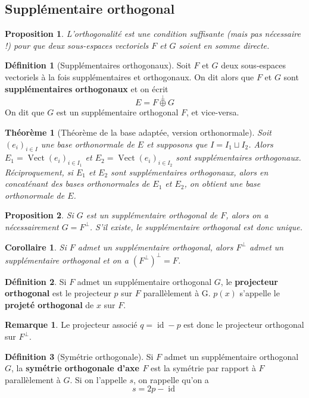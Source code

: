 \documentclass[french]{book}
\theoremstyle{plain}
\newtheorem{thm}{Théorème}[chapter]
\newtheorem{prop}{Proposition}[chapter]
\newtheorem{cor}{Corollaire}[chapter]
\theoremstyle{definition}
\newtheorem{dfn}{Définition}[chapter]
\newtheorem{rmq}{Remarque}[chapter]
\theoremstyle{remark}
\DeclareMathOperator{\vect}{Vect}
\DeclareMathOperator{\id}{id}
\begin{document}
\subsection{Supplémentaire orthogonal}
\begin{prop}
	L'orthogonalité est une condition suffisante (mais pas nécessaire !) pour que deux sous-espaces vectoriels $F$ et $G$ soient en somme directe.
\end{prop}
\begin{dfn}[Supplémentaires orthogonaux]
	Soit $F$ et $G$ deux sous-espaces vectoriels à la fois supplémentaires et orthogonaux. On dit alors que $F$ et $G$ sont \textbf{supplémentaires orthogonaux} et on écrit $$E=F\overset{\perp}{\oplus} G$$ On dit que $G$ est un supplémentaire orthogonal $F$, et vice-versa.
\end{dfn}
\begin{thm}[Théorème de la base adaptée, version orthonormale]
	Soit $(e_i)_{i\in I}$ une base orthonormale de $E$ et supposons que $I=I_1\sqcup I_2$. Alors $E_1=\vect(e_i)_{i\in I_1}$ et $E_2=\vect(e_i)_{i\in I_2}$ sont supplémentaires orthogonaux. Réciproquement, si $E_1$ et $E_2$ sont supplémentaires orthogonaux, alors en concaténant des bases orthonormales de $E_1$ et $E_2$, on obtient une base orthonormale de $E$.
\end{thm}
\begin{prop}
	Si $G$ est un supplémentaire orthogonal de $F$, alors on a nécessairement $G=F^\perp$. S'il existe, le supplémentaire orthogonal est donc unique.
\end{prop}
\begin{cor}
	Si $F$ admet un supplémentaire orthogonal, alors $F^\perp$ admet un supplémentaire orthogonal et on a $(F^\perp)^\perp=F$. 
\end{cor}
\begin{dfn}
	Si $F$ admet un supplémentaire orthogonal $G$, le \textbf{projecteur orthogonal} est le projecteur $p$ sur $F$ parallèlement à G. $p(x)$ s'appelle le \textbf{projeté orthogonal} de $x$ sur $F$.
\end{dfn}
\begin{rmq} Le projecteur associé $q=\id-p$ est donc le projecteur orthogonal sur $F^\perp$. \end{rmq}
\begin{dfn}[Symétrie orthogonale]
	Si $F$ admet un supplémentaire orthogonal $G$, la \textbf{symétrie orthogonale d'axe $F$} est la symétrie par rapport à $F$ parallèlement à $G$. Si on l'appelle $s$, on rappelle qu'on a $$s=2p-\id$$
\end{dfn}
\end{document}
